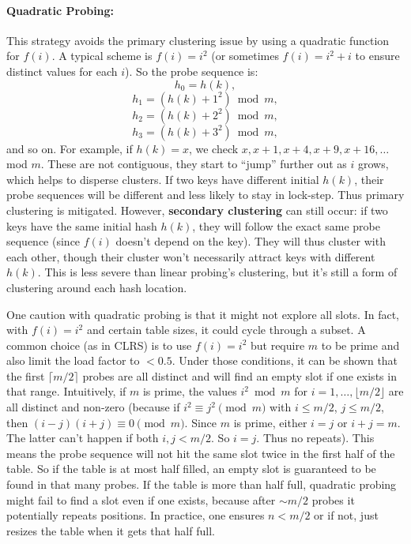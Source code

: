 \documentclass[11pt]{article}
\begin{document}
\paragraph{Quadratic Probing:} This strategy avoids the primary clustering issue by using a quadratic function for $f(i)$. A typical scheme is $f(i) = i^2$ (or sometimes $f(i)=i^2 + i$ to ensure distinct values for each $i$). So the probe sequence is:
\[ h_0 = h(k), \]
\[ h_1 = (h(k) + 1^2) \bmod m, \]
\[ h_2 = (h(k) + 2^2) \bmod m, \]
\[ h_3 = (h(k) + 3^2) \bmod m, \]
and so on. For example, if $h(k)=x$, we check $x, x+1, x+4, x+9, x+16, \ldots$ mod $m$. These are not contiguous, they start to “jump” further out as $i$ grows, which helps to disperse clusters. If two keys have different initial $h(k)$, their probe sequences will be different and less likely to stay in lock-step. Thus primary clustering is mitigated. However, \textbf{secondary clustering} can still occur: if two keys have the same initial hash $h(k)$, they will follow the exact same probe sequence (since $f(i)$ doesn’t depend on the key). They will thus cluster with each other, though their cluster won’t necessarily attract keys with different $h(k)$. This is less severe than linear probing’s clustering, but it’s still a form of clustering around each hash location.

One caution with quadratic probing is that it might not explore all slots. In fact, with $f(i)=i^2$ and certain table sizes, it could cycle through a subset. A common choice (as in CLRS) is to use $f(i) = i^2$ but require $m$ to be prime and also limit the load factor to $< 0.5$. Under those conditions, it can be shown that the first $\lceil m/2 \rceil$ probes are all distinct and will find an empty slot if one exists in that range. Intuitively, if $m$ is prime, the values $i^2 \bmod m$ for $i=1,\ldots,\lfloor m/2 \rfloor$ are all distinct and non-zero (because if $i^2 \equiv j^2 \pmod m$ with $i \le m/2$, $j \le m/2$, then $(i-j)(i+j) \equiv 0 \pmod m$. Since $m$ is prime, either $i=j$ or $i+j=m$. The latter can’t happen if both $i,j < m/2$. So $i=j$. Thus no repeats). This means the probe sequence will not hit the same slot twice in the first half of the table. So if the table is at most half filled, an empty slot is guaranteed to be found in that many probes. If the table is more than half full, quadratic probing might fail to find a slot even if one exists, because after $\sim m/2$ probes it potentially repeats positions. In practice, one ensures $n < m/2$ or if not, just resizes the table when it gets that half full.
\end{document}
